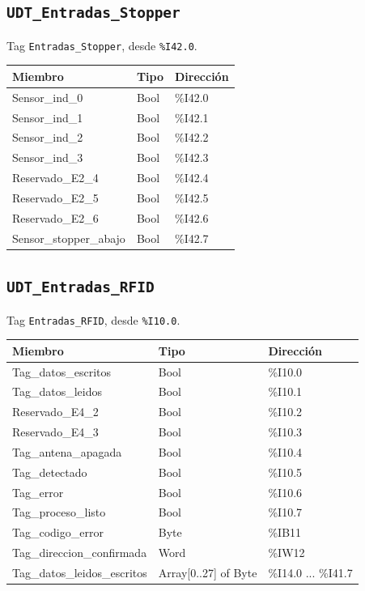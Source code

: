 \medskip
\subsection*{\texttt{UDT\_Entradas\_Stopper}}
Tag \texttt{Entradas\_Stopper}, desde \texttt{\%I42.0}.\par\smallskip
\begin{tabular}{>{\ttfamily\small}p{5.2cm}>{\ttfamily\small}p{4.2cm}>{\ttfamily\small}p{2.4cm}}
\toprule
\textnormal{\textbf{Miembro}} & \textnormal{\textbf{Tipo}} & \textnormal{\textbf{Dirección}} \\
\midrule
Sensor\_ind\_0 & Bool & \%I42.0 \\
Sensor\_ind\_1 & Bool & \%I42.1 \\
Sensor\_ind\_2 & Bool & \%I42.2 \\
Sensor\_ind\_3 & Bool & \%I42.3 \\
Reservado\_E2\_4 & Bool & \%I42.4 \\
Reservado\_E2\_5 & Bool & \%I42.5 \\
Reservado\_E2\_6 & Bool & \%I42.6 \\
Sensor\_stopper\_abajo & Bool & \%I42.7 \\
\bottomrule
\end{tabular}

\medskip
\subsection*{\texttt{UDT\_Entradas\_RFID}}
Tag \texttt{Entradas\_RFID}, desde \texttt{\%I10.0}.\par\smallskip
\begin{tabular}{>{\ttfamily\small}p{5.2cm}>{\ttfamily\small}p{4.2cm}>{\ttfamily\small}p{2.4cm}}
\toprule
\textnormal{\textbf{Miembro}} & \textnormal{\textbf{Tipo}} & \textnormal{\textbf{Dirección}} \\
\midrule
Tag\_datos\_escritos & Bool & \%I10.0 \\
Tag\_datos\_leidos & Bool & \%I10.1 \\
Reservado\_E4\_2 & Bool & \%I10.2 \\
Reservado\_E4\_3 & Bool & \%I10.3 \\
Tag\_antena\_apagada & Bool & \%I10.4 \\
Tag\_detectado & Bool & \%I10.5 \\
Tag\_error & Bool & \%I10.6 \\
Tag\_proceso\_listo & Bool & \%I10.7 \\
Tag\_codigo\_error & Byte & \%IB11 \\
Tag\_direccion\_confirmada & Word & \%IW12 \\
Tag\_datos\_leidos\_escritos & Array[0..27] of Byte & \%I14.0 ... \%I41.7 \\
\bottomrule
\end{tabular}

